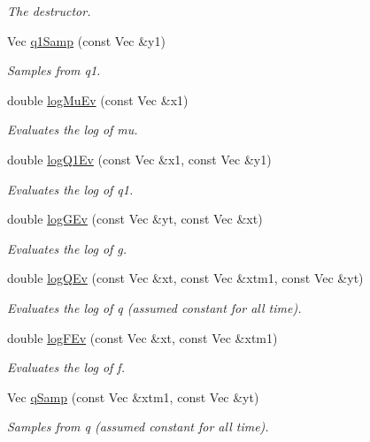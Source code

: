 \begin{DoxyCompactItemize}
\begin{DoxyCompactList}\small\item\em The destructor. \end{DoxyCompactList}\item 
Vec \hyperlink{classMSVolSISR_ac828fdce8a00f9ac3adbe0fa019fe49d}{q1\+Samp} (const Vec \&y1)
\begin{DoxyCompactList}\small\item\em Samples from q1. \end{DoxyCompactList}\item 
double \hyperlink{classMSVolSISR_a2af842b09bada27765bf8e7e60c59183}{log\+Mu\+Ev} (const Vec \&x1)
\begin{DoxyCompactList}\small\item\em Evaluates the log of mu. \end{DoxyCompactList}\item 
double \hyperlink{classMSVolSISR_a9c776bfbf157ff4f0dc3cbe1c4212142}{log\+Q1\+Ev} (const Vec \&x1, const Vec \&y1)
\begin{DoxyCompactList}\small\item\em Evaluates the log of q1. \end{DoxyCompactList}\item 
double \hyperlink{classMSVolSISR_a1e7efc4dd05351872764983a99a0c5ed}{log\+G\+Ev} (const Vec \&yt, const Vec \&xt)
\begin{DoxyCompactList}\small\item\em Evaluates the log of g. \end{DoxyCompactList}\item 
double \hyperlink{classMSVolSISR_af5ef1c3d5499bc9f2693a3f918def613}{log\+Q\+Ev} (const Vec \&xt, const Vec \&xtm1, const Vec \&yt)
\begin{DoxyCompactList}\small\item\em Evaluates the log of q (assumed constant for all time). \end{DoxyCompactList}\item 
double \hyperlink{classMSVolSISR_acd51af2d17300973b8fa4748e5729f3c}{log\+F\+Ev} (const Vec \&xt, const Vec \&xtm1)
\begin{DoxyCompactList}\small\item\em Evaluates the log of f. \end{DoxyCompactList}\item 
Vec \hyperlink{classMSVolSISR_a4f2f68902ba97f6dee582f1f01d1f5d7}{q\+Samp} (const Vec \&xtm1, const Vec \&yt)
\begin{DoxyCompactList}\small\item\em Samples from q (assumed constant for all time). \end{DoxyCompactList}\end{DoxyCompactItemize}


